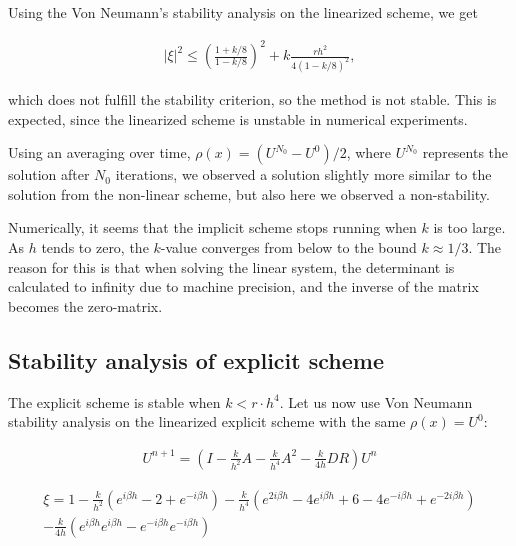 


Using the Von Neumann's stability analysis on the linearized scheme, we get 

\begin{align*}
|\xi |^2 \le \left(\frac{1+k/8}{1-k/8}\right)^2 + k\frac{rh^2}{4(1-k/8)^2},
\end{align*}

which does not fulfill the stability criterion, so the method is not stable. This is expected, since the linearized scheme is unstable in numerical experiments. 

Using an averaging over time, $\rho(x) = (U^{N_0}-U^0)/2$, where $U^{N_0}$ represents the solution after $N_0$ iterations, we observed a solution slightly more similar to the solution from the non-linear scheme, but also here we observed a non-stability.
 
Numerically, it seems that the implicit scheme stops running when $k$ is too large. As $h$ tends to zero, the $k$-value converges from below to the bound $k \approx 1/3$. The reason for this is that when solving the linear system, the determinant is calculated to infinity due to machine precision, and the inverse of the matrix becomes the zero-matrix. 


\subsection*{Stability analysis of explicit scheme}

The explicit scheme is stable when $k < r \cdot h^4$. Let us now use Von Neumann stability analysis on the linearized explicit scheme with the same $\rho(x) = U^0$:


\begin{align*}
U^{n+1} = \left(I - \frac{k}{h^2}A - \frac{k}{h^4}A^2 - \frac{k}{4h} DR\right)U^{n} 
\end{align*}


\begin{align*}
\xi = 1 - \frac{k}{h^2}(e^{i\beta h}-2+e^{-i\beta h}) - \frac{k}{h^4}(e^{2i\beta h}-4e^{i\beta h}+6-4e^{-i\beta h}+e^{-2i\beta h}) \\
 - \frac{k}{4h}(e^{i\beta h}e^{i\beta h} - e^{-i\beta h}e^{-i\beta h})\\
\end{align*}

